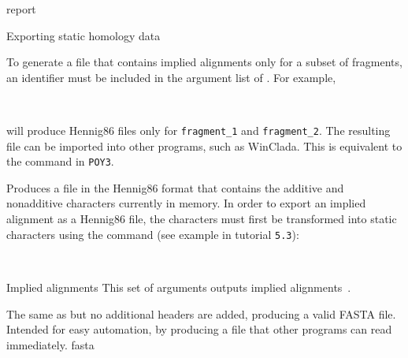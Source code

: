 \begin{command}{report}{}
\begin{arguments}
\begin{argumentgroup}{Exporting static homology data}
            \begin{statement}
                To generate a file that contains implied
                alignments only for a subset of fragments, an identifier must be
                included in the argument list of . For
                example, 
                \begin{flushleft}
                     \\
                \end{flushleft}
                will produce Hennig86 files only for
                \texttt{fragment\_1} and \texttt {fragment\_2}. The resulting file can 
                be imported into other programs,
                such as WinClada.  This is equivalent to the
                 command in \texttt{POY3}.
            \end{statement}

                {Produces a file in the Hennig86 format that contains the
                additive and nonadditive characters currently in memory.  In
                order to export an implied alignment as a Hennig86 file, the
                characters must first be transformed into static characters
                using the  command (see example in tutorial \texttt{5.3}): 
                \begin{flushleft}
                     \\
                \end{flushleft}}
                {}
        
        \end{argumentgroup}
        
        \begin{argumentgroup}{Implied alignments}
            {This set of arguments outputs implied alignments~\cite{wheeler2003}.} 

                {The same as  but no additional headers
                are added, producing a valid FASTA file. Intended for easy
                automation, by producing a file that other programs can read
                immediately.}
                {fasta}


\end{argumentgroup}
\end{arguments}
\end{command}
